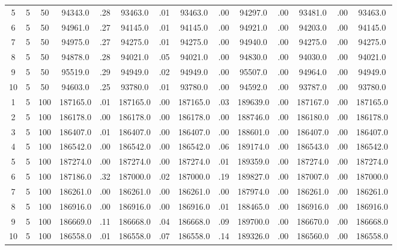\documentclass[12pt,a4paper]{article}
\begin{document}
\begin{center}
{\begin{tabular}{|ccc|cc|cc|cc|cc|cc|c|}
5             &   5&  50&  94343.0&  .28&  93463.0&  .01&  93463.0&  .00&  94297.0&  .00&  93481.0&  .00&  93463.0\\[-0.01in]
6             &   5&  50&  94961.0&  .27&  94145.0&  .01&  94145.0&  .00&  94921.0&  .00&  94203.0&  .00&  94145.0\\[-0.01in]
7             &   5&  50&  94975.0&  .27&  94275.0&  .01&  94275.0&  .00&  94940.0&  .00&  94275.0&  .00&  94275.0\\[-0.01in]
8             &   5&  50&  94878.0&  .28&  94021.0&  .05&  94021.0&  .00&  94830.0&  .00&  94030.0&  .00&  94021.0\\[-0.01in]
9             &   5&  50&  95519.0&  .29&  94949.0&  .02&  94949.0&  .00&  95507.0&  .00&  94964.0&  .00&  94949.0\\[-0.01in]
10            &   5&  50&  94603.0&  .25&  93780.0&  .01&  93780.0&  .00&  94592.0&  .00&  93787.0&  .00&  93780.0\\[-0.01in]
1             &   5& 100& 187165.0&  .01& 187165.0&  .00& 187165.0&  .03& 189639.0&  .00& 187167.0&  .00& 187165.0\\[-0.01in]
2             &   5& 100& 186178.0&  .00& 186178.0&  .00& 186178.0&  .00& 188746.0&  .00& 186180.0&  .00& 186178.0\\[-0.01in]
3             &   5& 100& 186407.0&  .01& 186407.0&  .00& 186407.0&  .00& 188601.0&  .00& 186407.0&  .00& 186407.0\\[-0.01in]
4             &   5& 100& 186542.0&  .00& 186542.0&  .00& 186542.0&  .06& 189174.0&  .00& 186543.0&  .00& 186542.0\\[-0.01in]
5             &   5& 100& 187274.0&  .00& 187274.0&  .00& 187274.0&  .01& 189359.0&  .00& 187274.0&  .00& 187274.0\\[-0.01in]
6             &   5& 100& 187186.0&  .32& 187000.0&  .02& 187000.0&  .19& 189827.0&  .00& 187007.0&  .00& 187000.0\\[-0.01in]
7             &   5& 100& 186261.0&  .00& 186261.0&  .00& 186261.0&  .00& 187974.0&  .00& 186261.0&  .00& 186261.0\\[-0.01in]
8             &   5& 100& 186916.0&  .00& 186916.0&  .00& 186916.0&  .01& 188465.0&  .00& 186916.0&  .00& 186916.0\\[-0.01in]
9             &   5& 100& 186669.0&  .11& 186668.0&  .04& 186668.0&  .09& 189700.0&  .00& 186670.0&  .00& 186668.0\\[-0.01in]
10            &   5& 100& 186558.0&  .01& 186558.0&  .07& 186558.0&  .14& 189326.0&  .00& 186560.0&  .00& 186558.0\\[-0.01in]

\end{tabular}}
\end{center}
\end{document}
